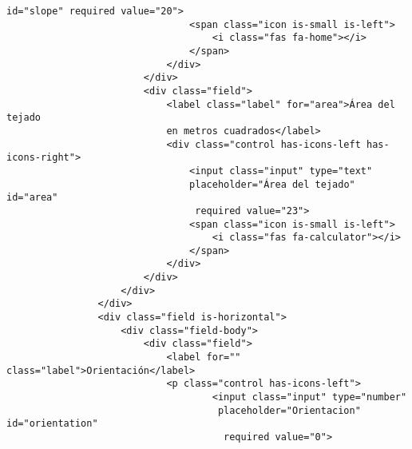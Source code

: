 \begin{lstlisting}[style=ES6, caption={public/index.html}]
                                 id="slope" required value="20">
                                <span class="icon is-small is-left">
                                    <i class="fas fa-home"></i>
                                </span>
                            </div>
                        </div>
                        <div class="field">
                            <label class="label" for="area">Área del tejado 
                            en metros cuadrados</label>
                            <div class="control has-icons-left has-icons-right">
                                <input class="input" type="text" 
                                placeholder="Área del tejado" id="area"
                                 required value="23">
                                <span class="icon is-small is-left">
                                    <i class="fas fa-calculator"></i>
                                </span>
                            </div>
                        </div>
                    </div>
                </div>
                <div class="field is-horizontal">
                    <div class="field-body">
                        <div class="field">
                            <label for="" class="label">Orientación</label>
                            <p class="control has-icons-left">
                                    <input class="input" type="number"
                                     placeholder="Orientacion" id="orientation"
                                      required value="0">


\end{lstlisting}
